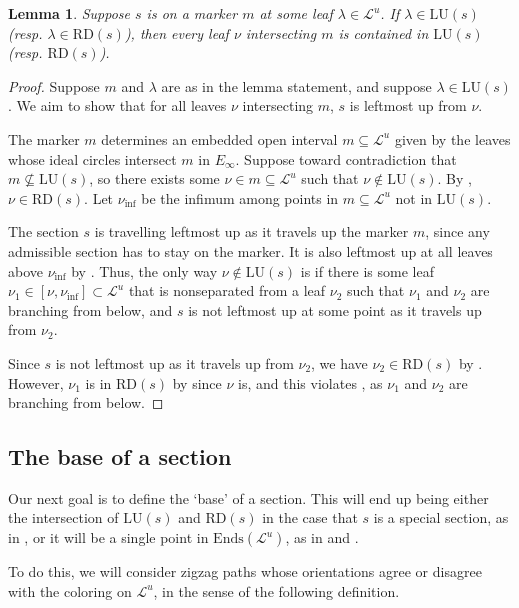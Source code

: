\documentclass[11pt]{amsart}
\renewcommand{\l}{\lambda}
\newcommand{\mc}{\mathcal}
\newcommand{\lu}{\mathrm{LU}}
\newcommand{\rd}{\mathrm{RD}}
\newcommand{\Ends}{\mathrm{Ends}}
\numberwithin{equation}{section}
\newtheorem{lemma}[equation]{Lemma}
\theoremstyle{definition}
\begin{document}
\begin{lemma}\label{lem:marker_sat}
	Suppose $s$ is on a marker $m$ at some leaf $\l\in\mc L^u$. If $\l\in \lu(s)$ (resp. $\l\in\rd(s)$), then every leaf $\nu$ intersecting $m$ is contained in $\lu(s)$ (resp. $\rd(s)$).
\end{lemma}

\begin{proof}

	
	Suppose $m$ and $\l$ are as in the lemma statement, and suppose $\l\in\lu(s)$.  We aim to show that for all leaves $\nu$ intersecting $m$, $s$ is leftmost up from $\nu$. 
	
	The marker $m$ determines an embedded open interval $m\subseteq\mc L^u$ given by the leaves whose ideal circles intersect $m$ in $E_\infty$. Suppose toward contradiction that $m\nsubseteq\lu(s)$, so there exists some $\nu\in m\subseteq\mc L^u$ such that $\nu\notin\lu(s)$. By , $\nu\in\rd(s)$. Let $\nu_{\inf{}}$ be the infimum among points in $m\subseteq\mc L^u$ not in $\lu(s)$. 

	
	The section $s$ is travelling leftmost up as it travels up the marker $m$, since any admissible section has to stay on the marker. It is also leftmost up at all leaves above $\nu_{\inf}$ by . Thus, the only way $\nu\notin\lu(s)$ is if there is some leaf $\nu_1\in[\nu,\nu_{\inf}]\subset\mc L^u$ that is nonseparated from a leaf $\nu_2$ such that $\nu_1$ and $\nu_2$ are branching from below, and $s$ is not leftmost up at some point as it travels up from $\nu_2$. 
	
	Since $s$ is not leftmost up as it travels up from $\nu_2$, we have $\nu_2\in \rd(s)$ by . However, $\nu_1$ is in $\rd(s)$ by  since $\nu$ is, and this violates , as $\nu_1$ and $\nu_2$ are branching from below.
\end{proof}

\subsection{The base of a section}\label{sec:base}
Our next goal is to define the `base' of a section. This will end up being either the intersection of $\lu(s)$ and $\rd(s)$ in the case that $s$ is a special section, as in , or it will be a single point in $\Ends(\mc L^u)$, as in  and .

To do this, we will consider zigzag paths whose orientations agree or disagree with the coloring on $\mc L^u$, in the sense of the following definition.
\end{document}
